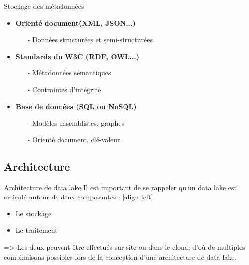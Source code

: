 \begin{frame}{Stockage des métadonnées}
    \begin{itemize}\itemsep1em
        \item \textbf{Orienté document(XML, JSON...)}
        \begin{itemize}
            \item[-] Données structurées et semi-structurées
        \end{itemize}
        \item \textbf{Standards du W3C (RDF, OWL...)}
        \begin{itemize}
            \item[-] Métadonnées sémantiques
            \item[-] Contraintes d’intégrité
        \end{itemize}
        \item \textbf{Base de données (SQL ou NoSQL)}
        \begin{itemize}
            \item[-] Modèles ensemblistes, graphes
            \item[-] Orienté document, clé-valeur
        \end{itemize}
    \end{itemize}
\end{frame}

\subsection{Architecture}
\begin{frame}{Architecture de data lake}
    Il est important de se rappeler qu'un data lake est articulé autour de deux composantes : 
    \vspace{0.2cm}
    [align left]
    \begin{itemize}
        \item Le stockage 
        \item Le traitement 
    \end{itemize}
    \vspace{0.2cm}
     => Les deux peuvent être effectués sur site ou dans le cloud, d'où de multiples combinaisons possibles lors de la conception d'une architecture de data lake.
\end{frame} 

